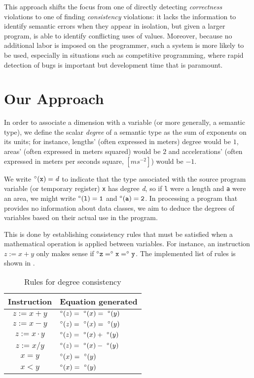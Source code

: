 \documentclass[12pt]{article}
\begin{document}
This approach shifts the focus from one of directly detecting \textit{correctness} violations to one of finding \textit{consistency} violations: it lacks the information to identify semantic errors when they appear in isolation, but given a larger program, is able to identify conflicting uses of values.
Moreover, because no additional labor is imposed on the programmer, such a system is more likely to be used, especially in situations such as competitive programming, where rapid detection of bugs is important but development time that is paramount.

\section{Our Approach}
\label{sec:approach}

In order to associate a dimension with a variable (or more generally, a semantic type), we define the scalar \textit{degree} of a semantic type as the sum of exponents on its units; for instance, lengths' (often expressed in meters) degree would be $1$, areas' (often expressed in meters squared) would be $2$ and accelerations' (often expressed in meters per seconds square, $[m s^{-2}]$) would be $-1$.

We write $\degree(\tt{x}) = \it{d}$ to indicate that the type associated with the source program variable (or temporary register) \texttt{x} has degree \textit{d}, so if \texttt{l} were a length and \texttt{a} were an area, we might write $\degree(\tt{l}) = 1$ and $\degree(\tt{a}) = 2$.
In processing a program that provides no information about data classes, we aim to deduce the degrees of variables based on their actual use in the program.

This is done by establishing consistency rules that must be satisfied when a mathematical operation is applied between variables.
For instance, an instruction $z := x + y$ only makes sense if $\degree{\tt{z}} = \degree{\tt{x}} = \degree{\tt{y}}$.
The implemented list of rules is shown in .

\begin{table}[H]
  \centering
  \setlength{\tabcolsep}{20pt}
  \begin{tabular}{c | l}
    \textbf{Instruction} & \textbf{Equation generated} \\
    \hline
    $z := x + y$ & $\degree(z) =\ \degree(x) =\ \degree(y)$ \\
    $z := x - y$ & $\degree(z) =\ \degree(x) =\ \degree(y)$ \\
    $z := x \cdot y$ & $\degree(z) =\ \degree(x) +\ \degree(y)$ \\
    $z := x / y$ & $\degree(z) =\ \degree(x) -\ \degree(y)$ \\
    $x = y$ & $\degree(x) =\ \degree(y)$ \\
    $x < y$ & $\degree(x) =\ \degree(y)$ \\
  \end{tabular}
  \caption{Rules for degree consistency}
  \label{table:dimensional-rules}
\end{table}
\end{document}
